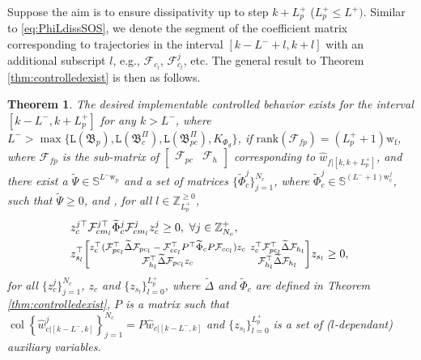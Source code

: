 \documentclass[11pt,print,draftcls,onecolumn,romanappendices]{ieeecolor}
\newtheorem{thm}{Theorem}
\DeclareMathOperator{\col}{col}
\newcommand{\Zp}[1]{\mathbb{Z}^+_{#1}}
\newcommand{\Znn}[1]{\mathbb{Z}^{\geq0}_{#1}}
\newcommand{\lag}[1]{\mathtt{L}\left(#1\right)}
\newcommand{\B}{\mathfrak{B}}
\newcommand{\F}{\mathcal{F}}
\newcommand{\bint}[1]{{|[#1]}}
\begin{document}
{Suppose the aim is to ensure dissipativity up to step $k+L_p^+$ ($L_p^+\leq L^+)$. Similar to \eqref{eq:PhiLdissSOS}, we denote the segment of the coefficient matrix corresponding to trajectories in the interval $[k-L^-+l,k+l]$ with an additional subscript $l$, e.g., $\F_{c_l}$, $\F_{c_l}^j$, etc. The general result to Theorem \ref{thm:controlledexist} is then as follows.
\begin{thm}\label{thm:controlledexistGeneral}
    The desired implementable controlled behavior exists for the interval $[k-L^-,k+L_p^+]$ for any $k>L^-$, where $L^->\max\{\lag{\B_p},\lag{\B_c^\Pi},\lag{\B_{pc}^\Pi},K_{\Phi_d}\}$, if $\mathrm{rank}\left(\F _{fp}\right)=(L_p^++1)\mathrm{w_{f}}$, where $\F_{fp}$ is the sub-matrix of $\begin{bmatrix}
        \F_{pc} & \F_h
    \end{bmatrix}$ corresponding to $\hat{w}_{f\bint{k,k+L_p^+}}$, and there exist a $\widetilde{\Psi}\in\mathbb{S}^{L^-\mathrm{w_p}}$ and a set of matrices $\{\widetilde{\Phi}_c^j\}_{j=1}^{N_c}$, where $\widetilde{\Phi}_c^j\in\mathbb{S}^{(L^-+1)\mathrm{w}_\mathrm{c}^j}$, such that $\widetilde{\Psi}\geq0$, and , for all $l\in\Znn{L_p^+}$,
	\begin{subequations}\setlength{\arraycolsep}{2pt}\label{eq:controlledexistGeneral}
	    \begin{align}
	        &z_c^{j\top}\F_{cm_l}^{j\top}\widetilde{\Phi}_c^j\F_{cm_l}^{j}z_c^j\geq0, \ \forall j\in\Zp{N_c},\label{eq:DOFGeneral}\\
	        &z_{s_l}^\top{\footnotesize\begin{bmatrix}
	            z_c^\top(\F_{pc_l}^\top\widetilde{\Delta}\F_{pc_l}-\F_{cc_l}^\top P^\top\widetilde{\Phi}_cP\F_{cc_l})z_c &z_c^\top\F_{pc_l}^\top\widetilde{\Delta}\F_{h_l}\\
	            \F_{h_l}^\top\widetilde{\Delta}\F_{pc_l}z_c& \F_{h_l}^\top\widetilde{\Delta}\F_{h_l}
	        \end{bmatrix}}z_{s_l}\geq0,\label{eq:minimumGeneral}\
	    \end{align}
	\end{subequations}
	for all $\{z_c^j\}_{j=1}^{N_c}$, $z_c$ and $\{z_{s_l}\}_{l=0}^{L_p^+}$, where $\widetilde{\Delta}$ and $\widetilde{\Phi}_c$ are defined in Theorem \ref{thm:controlledexist}, $P$ is a matrix such that $\col\left\{\hat{w}_{c\bint{k-L^-,k}}^j\right\}_{j=1}^{N_c}=P\hat{w}_{c\bint{k-L^-,k}}$ and $\{z_{s_l}\}_{l=0}^{L_p^+}$ is a set of ($l$-dependant) auxiliary variables.
\end{thm}

}
\end{document}
